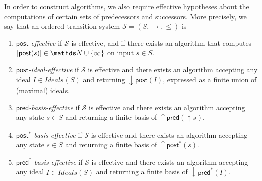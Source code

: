 \documentclass[runningheads]{llncs}
\newcommand{\pred}{\textsf{pred}}
\newcommand{\post}{\textsf{post}}
\begin{document}
In order to construct algorithms, we also require effective hypotheses about the computations of certain sets of predecessors and successors. More precisely, we say that an ordered transition system $\mathscr{S}=(S, \rightarrow, \leq)$ is 
\begin{enumerate}\label{on effectivity}
%
\item {\em $\post$-effective} if $\mathscr{S}$ is effective, and if there
exists an algorithm that computes $|\post(s)| \in \N \cup \{\infty\}$ 
on input $s \in S$.
%
%
\item {\em $\post$-ideal-effective} if $\mathscr{S}$ is effective and there exists an algorithm accepting
any ideal $I \in Ideals(S)$ and returning $\mathop{\downarrow} \post(I)$, expressed as a finite union of (maximal) ideals.
%
\item {\em $\pred$-basis-effective} \cite{DBLP:journals/tcs/FinkelS01,DBLP:journals/iandc/AbdullaCJT00} if $\mathscr{S}$ is effective and there exists an algorithm accepting
any state $s \in S$ and returning a finite basis of $\mathop{\uparrow} \pred(\mathop{\uparrow} s)$.
%
%
\item {\em $\post^*$-basis-effective} \cite{DBLP:conf/gg/Ozkan22,DBLP:journals/corr/abs-2108-00889} if $\mathscr{S}$ is effective and there exists an algorithm accepting
any state $s \in S$ and returning a finite basis of $\mathop{\uparrow} \post^*(s)$.
%
\item {\em $\pred^*$-basis-effective} if $\mathscr{S}$ is effective and there exists an algorithm accepting
any ideal $I \in Ideals(S)$ and returning a finite basis of $\mathop{\downarrow} \pred^*(I)$.
\end{enumerate}
\end{document}
